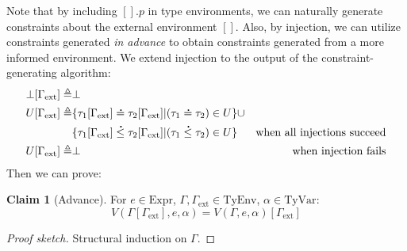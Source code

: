 \documentclass{article}
\theoremstyle{definition}
\newtheorem{clm}{Claim}[section]
\newcommand*{\A}[1]{\overset{\,_{\mbox{\Large .}}}{#1}}
\newcommand*{\Expr}{\text{Expr}}
\newcommand*{\TyEnv}{\text{TyEnv}}
\newcommand*{\TyVar}{\text{TyVar}}
\newcommand*{\external}{\Gamma_{\text{ext}}}
\begin{document}
Note that by including $[].p$ in type environments, we can naturally generate constraints about the external environment $[]$.
Also, by injection, we can utilize constraints generated \emph{in advance} to obtain constraints generated from a more informed environment.
We extend injection to the output of the constraint-generating algorithm:
\begin{align*}
  \bot[\external] \triangleq & \bot                                                                                                          \\
  U[\external]    \triangleq & \{\tau_1[\external]\A{=}\tau_2[\external]|(\tau_1\A{=}\tau_2)\in U\}\cup                                      \\
                             & \{\tau_1[\external]\A{\le}\tau_2[\external]|(\tau_1\A{\le}\tau_2)\in U\} & \text{when all injections succeed} \\
  U[\external]    \triangleq & \bot                                                                     & \text{when injection fails}
\end{align*}
Then we can prove:
\begin{clm}[Advance]
  For $e\in\Expr$, $\Gamma,\external\in\TyEnv$, $\alpha\in\TyVar$:
  \[V(\Gamma[\external],e,\alpha)=V(\Gamma,e,\alpha)[\external]\]
\end{clm}
\begin{proof}[Proof sketch]
  Structural induction on $\Gamma$.
\end{proof}
\end{document}
